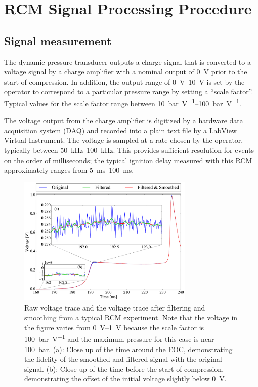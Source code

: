 \documentclass[12pt]{../ussci}
\begin{document}
\section{RCM Signal Processing Procedure}\label{rcm-signal-processing-procedure}

\subsection{Signal measurement}\label{signal-measurement}

The dynamic pressure transducer outputs a charge signal that is
converted to a voltage signal by a charge amplifier with a nominal
output of \SI{0}{\V} prior to the start of compression. In addition, the output
range of \SIrange{0}{10}{\V} is set by the operator to correspond to a
particular pressure range by setting a ``scale factor''. Typical values
for the scale factor range between \SIrange{10}{100}{\bar\per\V}.

The voltage output from the charge amplifier is digitized by a hardware
data acquisition system (DAQ) and recorded into a plain text file by a
LabView Virtual Instrument. The voltage is sampled at a rate chosen by
the operator, typically between \SIrange{50}{100}{\kHz}. This provides
sufficient resolution for events on the order of milliseconds; the
typical ignition delay measured with this RCM approximately ranges from
\SIrange{5}{100}{\ms}.

\begin{figure}[htbp]
\centering
\includegraphics[width=0.75\textwidth]{figures/raw-voltage.png}
\caption{Raw voltage trace and the voltage trace after filtering and
smoothing from a typical RCM experiment. Note that the voltage in the
figure varies from \SIrange{0}{1}{\V} because the scale factor is \SI{100}{\bar\per\V} and
the maximum pressure for this case is near \SI{100}{\bar}. (a): Close up of the
time around the EOC, demonstrating the fidelity of the smoothed and
filtered signal with the original signal. (b): Close up of the time
before the start of compression, demonstrating the offset of the initial
voltage slightly below \SI{0}{\V}.}
\label{fig:raw-voltage}
\end{figure}
\end{document}
